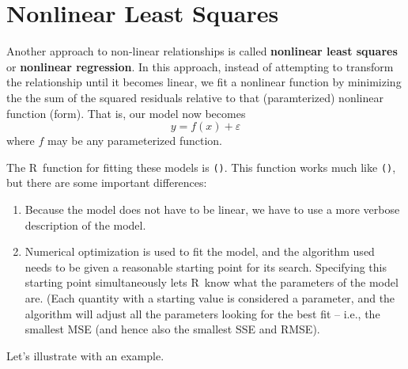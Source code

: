 \documentclass[twoside]{book}\usepackage[]{graphicx}\usepackage[]{xcolor}
\newcommand{\Rindex}[1]{\index{\texttt{#1}}}
\newcommand{\function}[1]{{\color{purple!75!blue}\texttt{\StrSubstitute{#1}{()}{}()}}\Rindex{#1}}
\def\R{{\sf R}}
\def\term#1{\textbf{#1}}
\newcounter{example}[section]
\begin{document}
\section{Nonlinear Least Squares}

Another approach to non-linear relationships is called \term{nonlinear least squares}
or \term{nonlinear regression}.  In this approach, instead of attempting to transform
the relationship until it becomes linear, we fit a nonlinear function by minimizing the 
the sum of the squared residuals relative to that (paramterized) nonlinear
function (form).  That is, our model now becomes
\[
y = f(x) + \varepsilon
\]
where $f$ may be any parameterized function.

The \R\ function for fitting these
models is \function{nls()}.  This function works much like \function{lm()},
but there are some important differences:
	\begin{enumerate}
		\item
			Because the model does not have to be linear, we have
			to use a more verbose description of the model.
		\item
			Numerical optimization is used to fit the model, and the algorithm
			used needs to be given a reasonable starting point for its search.
			Specifying this starting point simultaneously lets \R\ know what the 
			parameters of the model are.  (Each quantity with a starting value
			is considered a parameter, and the algorithm will adjust all the parameters
			looking for the best fit -- i.e., the smallest MSE (and hence also
			the smallest SSE and RMSE).
	\end{enumerate}

Let's illustrate with an example.
\end{document}
